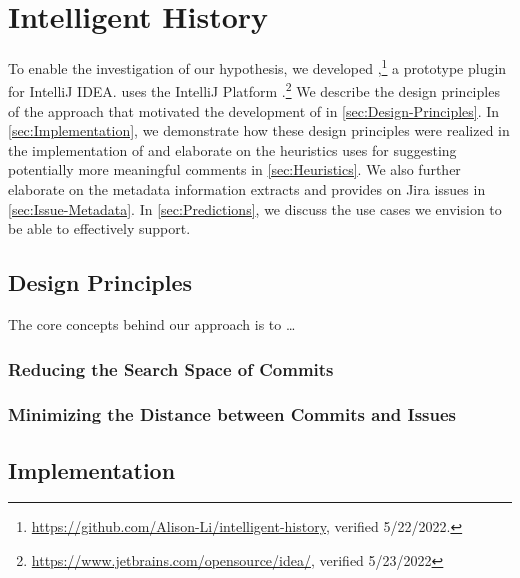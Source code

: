 \chapter{Intelligent History}
\label{ch:Intelligent-History}

To enable the investigation of our hypothesis, we developed ,\footnote{\url{https://github.com/Alison-Li/intelligent-history}, verified 5/22/2022.} a prototype plugin for IntelliJ IDEA.
 uses the IntelliJ Platform .\footnote{\url{https://www.jetbrains.com/opensource/idea/}, verified 5/23/2022}
We describe the design principles of the approach that motivated the development of  in \autoref{sec:Design-Principles}. 
In \autoref{sec:Implementation}, we demonstrate how these design principles were realized in the implementation of  and elaborate on the heuristics  uses
for suggesting potentially more meaningful comments in \autoref{sec:Heuristics}.
We also further elaborate on the metadata information  extracts and provides on Jira issues in \autoref{sec:Issue-Metadata}. 
In \autoref{sec:Predictions}, we discuss the use cases we envision  to be able to effectively support.

\section{Design Principles}
\label{sec:Design-Principles}

The core concepts behind our approach is to \dots

\subsection{Reducing the Search Space of Commits}

\subsection{Minimizing the Distance between Commits and Issues}

\section{Implementation}
\label{sec:Implementation}


